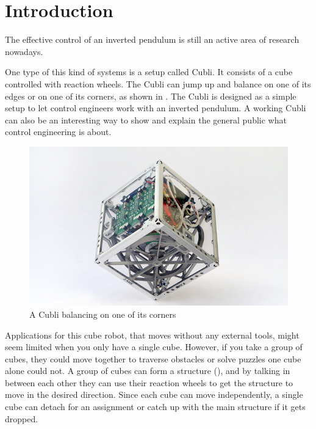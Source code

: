 \chapter{Introduction}\label{introduction}
The effective control of an inverted pendulum is still an active area of research nowadays. \cite{JHuber}

One type of this kind of systems is a setup called Cubli. It consists of a cube controlled with reaction wheels. The Cubli can jump up and balance on one of its edges or on one of its corners, as shown in .
The Cubli is designed as a simple setup to let control engineers work with an inverted pendulum. A working Cubli can also be an interesting way to show and explain the general public  what control engineering is about. \cite{MGajamohan}
%
\begin{figure}[H] 
	\centering
	\includegraphics[scale=1.3]{figures/CubliCorner-700x430}
	\caption{A Cubli balancing on one of its corners\cite{RAndrea}}
	\label{CubliCorner}
\end{figure}
%
Applications for this cube robot, that moves without any external tools, might seem limited when you only have a single cube. However, if you take a group of cubes, they could move together to traverse obstacles or solve puzzles one cube alone could not. A group of cubes can form a structure (), and by talking in between each other they can use their reaction wheels to get the structure to move in the desired direction. Since each cube can move independently, a single cube can detach for an assignment or catch up with the main structure if it gets dropped. \cite{JRomanishin}
%
